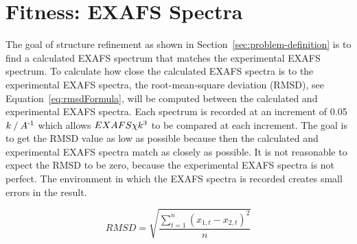 \section{Fitness: EXAFS Spectra}
\label{sec:fitness-exafs}

The goal of structure refinement as shown in Section~\ref{sec:problem-definition} is to find a calculated EXAFS spectrum that matches the experimental EXAFS spectrum. To calculate how close the calculated EXAFS spectra is to the experimental EXAFS spectra, the root-mean-square deviation (RMSD), see Equation~\ref{eq:rmsdFormula}, will be computed between the calculated and experimental EXAFS spectra. Each spectrum is recorded at an increment of 0.05 $k \mathbin{/} A\textsuperscript{-1}$ which allows $EXAFS \chi k\textsuperscript{3}$ to be compared at each increment. The goal is to get the RMSD value as low as possible because then the calculated and experimental EXAFS spectra match as closely as possible. It is not reasonable to expect the RMSD to be zero, because the experimental EXAFS spectra is not perfect. The environment in which the EXAFS spectra is recorded creates small errors in the result.

\begin{equation}
  \label{eq:rmsdFormula}
  RMSD = \sqrt{\frac{\sum_{t=1}^{n} \left ( x_{1,t}-x_{2,t} \right )^{2}}{n}}
\end{equation}